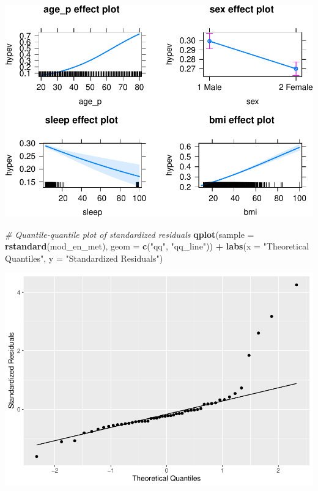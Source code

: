 \documentclass[
]{book}
\newenvironment{Shaded}{\begin{snugshade}}{\end{snugshade}}
\newcommand{\CommentTok}[1]{\textcolor[rgb]{0.56,0.35,0.01}{\textit{#1}}}
\newcommand{\DataTypeTok}[1]{\textcolor[rgb]{0.13,0.29,0.53}{#1}}
\newcommand{\KeywordTok}[1]{\textcolor[rgb]{0.13,0.29,0.53}{\textbf{#1}}}
\newcommand{\NormalTok}[1]{#1}
\newcommand{\OperatorTok}[1]{\textcolor[rgb]{0.81,0.36,0.00}{\textbf{#1}}}
\newcommand{\StringTok}[1]{\textcolor[rgb]{0.31,0.60,0.02}{#1}}
\begin{document}
\includegraphics{R/Rmodels/figures/unnamed-chunk-110-1.pdf}

\begin{Shaded}
\begin{Highlighting}[]
  \CommentTok{\# Quantile{-}quantile plot of standardized residuals}
  \KeywordTok{qplot}\NormalTok{(}\DataTypeTok{sample =} \KeywordTok{rstandard}\NormalTok{(mod\_en\_met), }\DataTypeTok{geom =} \KeywordTok{c}\NormalTok{(}\StringTok{"qq"}\NormalTok{, }\StringTok{"qq\_line"}\NormalTok{)) }\OperatorTok{+}\StringTok{ }
\StringTok{      }\KeywordTok{labs}\NormalTok{(}\DataTypeTok{x =} \StringTok{"Theoretical Quantiles"}\NormalTok{, }\DataTypeTok{y =} \StringTok{"Standardized Residuals"}\NormalTok{)}
\end{Highlighting}
\end{Shaded}

\includegraphics{R/Rmodels/figures/unnamed-chunk-110-2.pdf}
\end{document}
